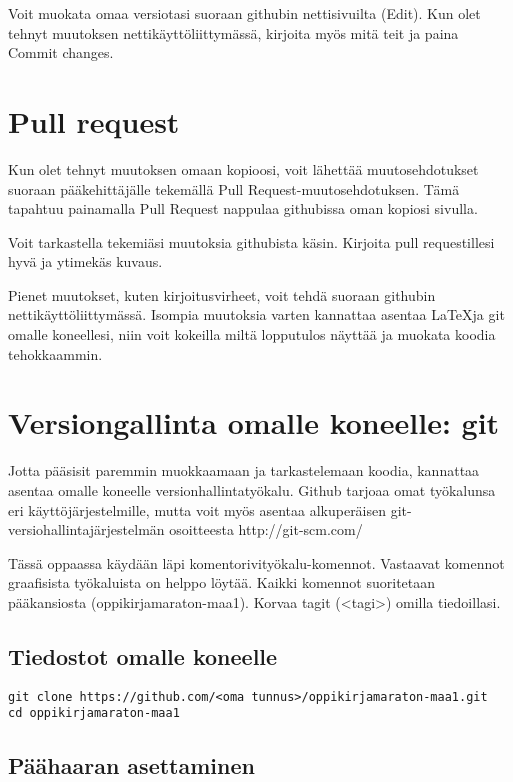 Voit muokata omaa versiotasi suoraan githubin nettisivuilta (Edit). Kun olet tehnyt muutoksen nettikäyttöliittymässä, kirjoita myös mitä teit ja paina Commit changes.

\section{Pull request}

Kun olet tehnyt muutoksen omaan kopioosi, voit lähettää muutosehdotukset suoraan pääkehittäjälle tekemällä Pull Request-muutosehdotuksen. Tämä tapahtuu painamalla Pull Request nappulaa githubissa oman kopiosi sivulla.

Voit tarkastella tekemiäsi muutoksia githubista käsin. Kirjoita pull requestillesi hyvä ja ytimekäs kuvaus.


Pienet muutokset, kuten kirjoitusvirheet, voit tehdä suoraan githubin nettikäyttöliittymässä. Isompia muutoksia varten kannattaa asentaa \LaTeX ja git omalle koneellesi, niin voit kokeilla miltä lopputulos näyttää ja muokata koodia tehokkaammin.

\section{Versiongallinta omalle koneelle: git}

Jotta pääsisit paremmin muokkaamaan ja tarkastelemaan koodia, kannattaa asentaa omalle koneelle versionhallintatyökalu. Github tarjoaa omat työkalunsa eri käyttöjärjestelmille, mutta voit myös asentaa alkuperäisen git-versiohallintajärjestelmän osoitteesta http://git-scm.com/

Tässä oppaassa käydään läpi komentorivityökalu-komennot. Vastaavat komennot graafisista työkaluista on helppo löytää. Kaikki komennot suoritetaan pääkansiosta (oppikirjamaraton-maa1). Korvaa tagit (<tagi>) omilla tiedoillasi.

\subsection{Tiedostot omalle koneelle}

\begin{verbatim}
git clone https://github.com/<oma tunnus>/oppikirjamaraton-maa1.git
cd oppikirjamaraton-maa1
\end{verbatim}

\subsection{Päähaaran asettaminen}

